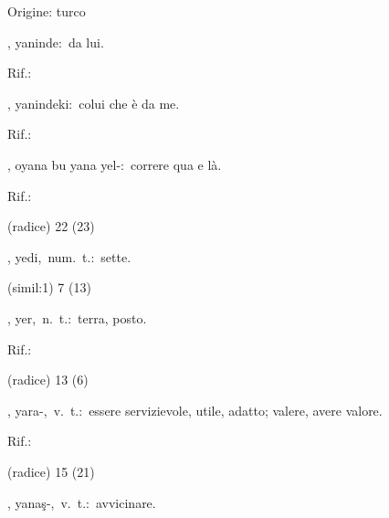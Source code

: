 \begin{glossario}{Origine: turco}
\begin{subvocedue}
\item[\subglossariobullet] , {\sf yaninde}:\ da lui.
\begin{subvocedue}
\item[Rif.:] 
\end{subvocedue}
\item[\subglossariobullet] , {\sf yanindeki}:\ colui che è da me.
\begin{subvocedue}
\item[Rif.:] 
\end{subvocedue}
\item[\subglossariobullet] , {\sf oyana bu yana yel-}:\ correre qua e là.
\begin{subvocedue}
\item[Rif.:] 
\end{subvocedue}
\item[(radice)]   22 (23)
\end{subvocedue}
\item[{\color{colorlowref}\spzrl{yed.I}},] {\sf yedi},\ num.\ t.:\ sette.
\begin{subvocedue}
\item[(simil:1)]   7 (13)
\end{subvocedue}
\item[{\color{colorlowref}\spzrl{yer}},] {\sf yer},\ n.\ t.:\ terra, posto.
\begin{subvocedue}
\item[Rif.:] 
\end{subvocedue}
\begin{subvocedue}
\item[(radice)]   13 (6)
\end{subvocedue}
\item[{\color{colorlowref}\spzrl{yar^AB}},] {\sf yara-},\ v.\ t.:\ essere servizievole, utile, adatto; valere, avere valore.
\begin{subvocedue}
\item[Rif.:] 
\end{subvocedue}
\begin{subvocedue}
\item[(radice)]   15 (21)
\end{subvocedue}
\item[{\color{colorlowref}\spzrl{yan^A^sB}},] {\sf yanaş-},\ v.\ t.:\ avvicinare.

\end{glossario}
